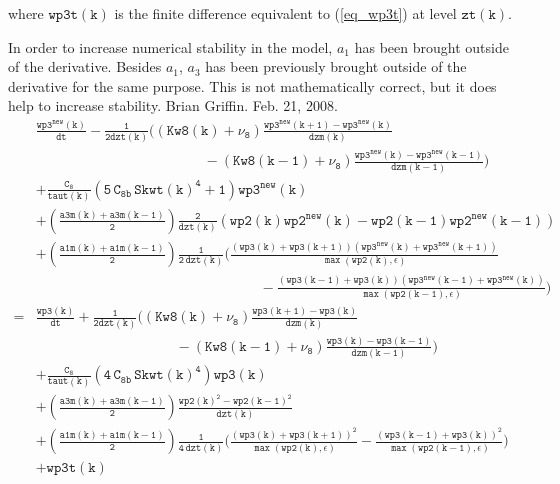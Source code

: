 \documentclass[11pt,fleqn]{article}
\begin{document}
%
where $\mathtt{wp3t(k)}$ is the finite difference equivalent to (\ref{eq_wp3t}) 
at level $\mathtt{zt(k)}$.
%

In order to increase numerical stability in the model, $a_{1}$ has been brought
outside of the derivative.  Besides $a_{1}$, $a_{3}$ has been previously brought
outside of the derivative for the same purpose.  This is not mathematically
correct, but it does help to increase stability.  Brian Griffin.  Feb. 21, 2008.
% 
\begin{equation}
\begin{split}
& \mathtt{
  \frac{wp3^{new}(k)}{dt}
  - \frac{1}{2dzt(k)} 
    \bigg( 
            \left(Kw8(k)+\nu_8\right)
            \frac{wp3^{new}(k+1)-wp3^{new}(k)}{dzm(k)} }  \\
& \mathtt{ \qquad \qquad \qquad \qquad \qquad \qquad
          - \left(Kw8(k-1)+\nu_8\right)
            \frac{wp3^{new}(k)-wp3^{new}(k-1)}{dzm(k-1)}
    \bigg)
  } \\
& \mathtt{
+ \frac{C_8}{taut(k)}
   \left(  5 \, C_{8b} \, {Skwt(k)}^4 + 1 \right) wp3^{new}(k)
  } \\
& \mathtt{
  + \left(\frac{a3m(k)+a3m(k-1)}{2}\right) \frac{2}{dzt(k)}
    \left(wp2(k) wp2^{new}(k) - wp2(k-1) wp2^{new}(k-1) \right)
  } \\
& \mathtt{
  + \left(\frac{a1m(k)+a1m(k-1)}{2}\right) \frac{1}{2 \, dzt(k)}
    \bigg(
      \frac{ \left(wp3(k)+wp3(k+1)\right)
             \left(wp3^{new}(k)+wp3^{new}(k+1)\right) }
           { \max\left( wp2(k), \epsilon \right) }
  } \\
& \mathtt{ \qquad \qquad \qquad \qquad \qquad \qquad \qquad \qquad
     -\frac{ \left(wp3(k-1)+wp3(k)\right)
             \left(wp3^{new}(k-1)+wp3^{new}(k)\right) }
           { \max\left( wp2(k-1), \epsilon \right) }
    \bigg)
  } \\
=& \mathtt{
  \frac{wp3(k)}{dt} 
  + \frac{1}{2dzt(k)} 
    \bigg( 
            \left(Kw8(k)+\nu_8\right)
            \frac{wp3(k+1)-wp3(k)}{dzm(k)} }  \\
& \mathtt{ \qquad \qquad \qquad \qquad \qquad
          - \left(Kw8(k-1)+\nu_8\right)
            \frac{wp3(k)-wp3(k-1)}{dzm(k-1)}
    \bigg)
  } \\
& \mathtt{
+ \frac{C_8}{taut(k)}
   \left( 4 \, C_{8b} \, {Skwt(k)}^4 \right) wp3(k)
  } \\
& \mathtt{
  + \left(\frac{a3m(k)+a3m(k-1)}{2}\right) \frac{wp2(k)^2 - wp2(k-1)^2 }
                                                {dzt(k)}
  } \\
& \mathtt{
  + \left(\frac{a1m(k)+a1m(k-1)}{2}\right) \frac{1}{4 \, dzt(k)}
    \bigg(
      \frac{ \left(wp3(k)+wp3(k+1)\right)^2 }
           { \max\left( wp2(k), \epsilon \right) }
     -\frac{ \left(wp3(k-1)+wp3(k)\right)^2 }
           { \max\left( wp2(k-1), \epsilon \right) }
    \bigg)
  } \\
& \mathtt{
+ wp3t(k)
  }
\end{split}
\end{equation}
\end{document}
